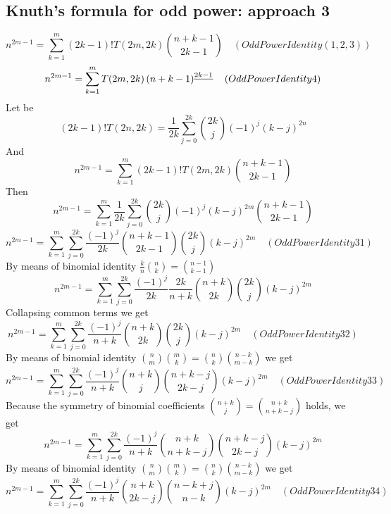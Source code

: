 \subsection{Knuth's formula for odd power: approach 3}\label{subsec:knuth's-formula-for-odd-power-approach-3}
\begin{equation*}
    n^{2m-1} = \sum_{k=1}^{m} (2k-1)! T(2m,2k) \binom{n+k-1}{2k-1} \quad
    (OddPowerIdentity(1,2,3))
\end{equation*}
\begin{equation*}
    n^{2m-1} = \sum_{k=1}^{m} T(2m,2k) \left(n+k-1 \right)^{\underline{2k-1}} \quad
    (OddPowerIdentity4)
\end{equation*}
Let be
\begin{equation*}
(2k-1)
    !T(2n, 2k) = \frac{1}{2k} \sum_{j=0}^{2k} \binom{2k}{j} (-1)^{j} (k-j)^{2n}
\end{equation*}
And
\begin{equation*}
    n^{2m-1} = \sum_{k=1}^{m} (2k-1)! T(2m,2k) \binom{n+k-1}{2k-1}
\end{equation*}
Then
\begin{equation*}
    n^{2m-1} = \sum_{k=1}^{m} \frac{1}{2k} \sum_{j=0}^{2k} \binom{2k}{j} (-1)^{j} (k-j)^{2m} \binom{n+k-1}{2k-1}
\end{equation*}
\begin{equation*}
    n^{2m-1} = \sum_{k=1}^{m} \sum_{j=0}^{2k} \frac{(-1)^{j}}{2k} \binom{n+k-1}{2k-1} \binom{2k}{j} (k-j)^{2m} \quad
    (OddPowerIdentity31)
\end{equation*}
By means of binomial identity $\frac{k}{n} \binom{n}{k} = \binom{n-1}{k-1}$
\begin{equation*}
    n^{2m-1} = \sum_{k=1}^{m} \sum_{j=0}^{2k} \frac{(-1)^{j}}{2k} \frac{2k}{n+k} \binom{n+k}{2k} \binom{2k}{j} (k-j)^{2m}
\end{equation*}
Collapsing common terms we get
\begin{equation*}
    n^{2m-1} = \sum_{k=1}^{m} \sum_{j=0}^{2k} \frac{(-1)^{j}}{n+k} \binom{n+k}{2k} \binom{2k}{j} (k-j)^{2m} \quad
    (OddPowerIdentity32)
\end{equation*}
By means of binomial identity $\binom{n}{m} \binom{m}{k} = \binom{n}{k} \binom{n-k}{m-k}$ we get
\begin{equation*}
    n^{2m-1} = \sum_{k=1}^{m} \sum_{j=0}^{2k} \frac{(-1)^{j}}{n+k} \binom{n+k}{j} \binom{n+k-j}{2k-j} (k-j)^{2m} \quad
    (OddPowerIdentity33)
\end{equation*}
Because the symmetry of binomial coefficients $\binom{n+k}{j} = \binom{n+k}{n+k-j}$ holds, we get
\begin{equation*}
    n^{2m-1} = \sum_{k=1}^{m} \sum_{j=0}^{2k} \frac{(-1)^{j}}{n+k} \binom{n+k}{n+k-j} \binom{n+k-j}{2k-j} (k-j)^{2m}
\end{equation*}
By means of binomial identity $\binom{n}{m} \binom{m}{k} = \binom{n}{k} \binom{n-k}{m-k}$ we get
\begin{equation*}
    n^{2m-1} = \sum_{k=1}^{m} \sum_{j=0}^{2k} \frac{(-1)^{j}}{n+k} \binom{n+k}{2k-j} \binom{n-k+j}{n-k} (k-j)^{2m} \quad
    (OddPowerIdentity34)
\end{equation*}